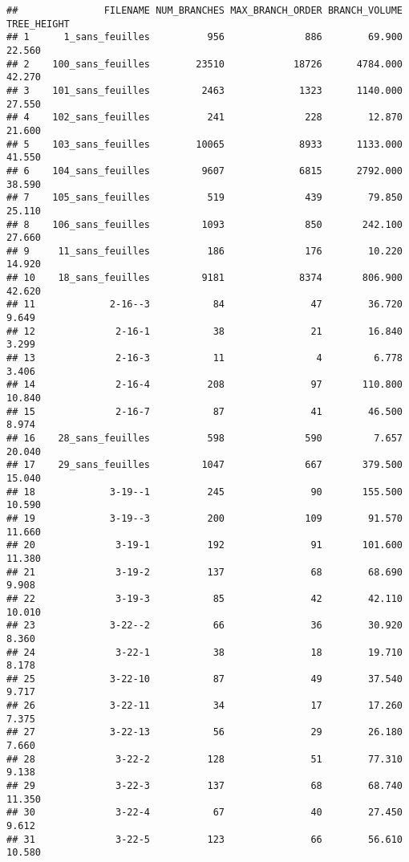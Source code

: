 \documentclass[]{article}
\begin{document}
\begin{verbatim}
##               FILENAME NUM_BRANCHES MAX_BRANCH_ORDER BRANCH_VOLUME TREE_HEIGHT
## 1      1_sans_feuilles          956              886        69.900      22.560
## 2    100_sans_feuilles        23510            18726      4784.000      42.270
## 3    101_sans_feuilles         2463             1323      1140.000      27.550
## 4    102_sans_feuilles          241              228        12.870      21.600
## 5    103_sans_feuilles        10065             8933      1133.000      41.550
## 6    104_sans_feuilles         9607             6815      2792.000      38.590
## 7    105_sans_feuilles          519              439        79.850      25.110
## 8    106_sans_feuilles         1093              850       242.100      27.660
## 9     11_sans_feuilles          186              176        10.220      14.920
## 10    18_sans_feuilles         9181             8374       806.900      42.620
## 11             2-16--3           84               47        36.720       9.649
## 12              2-16-1           38               21        16.840       3.299
## 13              2-16-3           11                4         6.778       3.406
## 14              2-16-4          208               97       110.800      10.840
## 15              2-16-7           87               41        46.500       8.974
## 16    28_sans_feuilles          598              590         7.657      20.040
## 17    29_sans_feuilles         1047              667       379.500      15.040
## 18             3-19--1          245               90       155.500      10.590
## 19             3-19--3          200              109        91.570      11.660
## 20              3-19-1          192               91       101.600      11.380
## 21              3-19-2          137               68        68.690       9.908
## 22              3-19-3           85               42        42.110      10.010
## 23             3-22--2           66               36        30.920       8.360
## 24              3-22-1           38               18        19.710       8.178
## 25             3-22-10           87               49        37.540       9.717
## 26             3-22-11           34               17        17.260       7.375
## 27             3-22-13           56               29        26.180       7.660
## 28              3-22-2          128               51        77.310       9.138
## 29              3-22-3          137               68        68.740      11.350
## 30              3-22-4           67               40        27.450       9.612
## 31              3-22-5          123               66        56.610      10.580

\end{verbatim}
\end{document}
